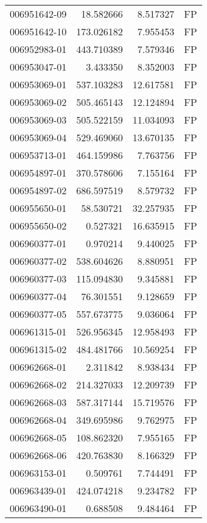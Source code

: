 \begin{tabular}{lrrl}
006951642-09 &   18.582666 &     8.517327 &   FP \\
006951642-10 &  173.026182 &     7.955453 &   FP \\
006952983-01 &  443.710389 &     7.579346 &   FP \\
006953047-01 &    3.433350 &     8.352003 &   FP \\
006953069-01 &  537.103283 &    12.617581 &   FP \\
006953069-02 &  505.465143 &    12.124894 &   FP \\
006953069-03 &  505.522159 &    11.034093 &   FP \\
006953069-04 &  529.469060 &    13.670135 &   FP \\
006953713-01 &  464.159986 &     7.763756 &   FP \\
006954897-01 &  370.578606 &     7.155164 &   FP \\
006954897-02 &  686.597519 &     8.579732 &   FP \\
006955650-01 &   58.530721 &    32.257935 &   FP \\
006955650-02 &    0.527321 &    16.635915 &   FP \\
006960377-01 &    0.970214 &     9.440025 &   FP \\
006960377-02 &  538.604626 &     8.880951 &   FP \\
006960377-03 &  115.094830 &     9.345881 &   FP \\
006960377-04 &   76.301551 &     9.128659 &   FP \\
006960377-05 &  557.673775 &     9.036064 &   FP \\
006961315-01 &  526.956345 &    12.958493 &   FP \\
006961315-02 &  484.481766 &    10.569254 &   FP \\
006962668-01 &    2.311842 &     8.938434 &   FP \\
006962668-02 &  214.327033 &    12.209739 &   FP \\
006962668-03 &  587.317144 &    15.719576 &   FP \\
006962668-04 &  349.695986 &     9.762975 &   FP \\
006962668-05 &  108.862320 &     7.955165 &   FP \\
006962668-06 &  420.763830 &     8.166329 &   FP \\
006963153-01 &    0.509761 &     7.744491 &   FP \\
006963439-01 &  424.074218 &     9.234782 &   FP \\
006963490-01 &    0.688508 &     9.484464 &   FP \\

\end{tabular}
